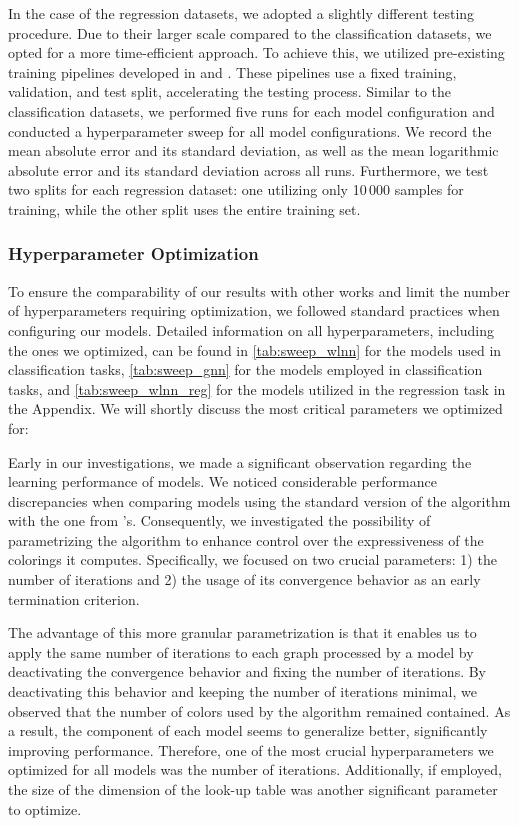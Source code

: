 In the case of the regression datasets, we adopted a slightly different testing procedure. Due to their larger scale compared to the classification datasets, we opted for a more time-efficient approach. To achieve this, we utilized pre-existing training pipelines developed in \cite{Mor+2020} and \cite{Morris2022}. These pipelines use a fixed training, validation, and test split, accelerating the testing process. Similar to the classification datasets, we performed five runs for each model configuration and conducted a hyperparameter sweep for all model configurations. We record the mean absolute error and its standard deviation, as well as the mean logarithmic absolute error and its standard deviation across all runs. Furthermore, we test two splits for each regression dataset: one utilizing only 10\,000 samples for training, while the other split uses the entire training set. 

\subsubsection{Hyperparameter Optimization}\label{sec:hyperparam}
To ensure the comparability of our results with other works and limit the number of hyperparameters requiring optimization, we followed standard practices when configuring our models. Detailed information on all hyperparameters, including the ones we optimized, can be found in \cref{tab:sweep_wlnn} for the \wlnn models used in classification tasks, \cref{tab:sweep_gnn} for the \gnn models employed in classification tasks, and \cref{tab:sweep_wlnn_reg} for the \wlnn models utilized in the regression task in the Appendix. We will shortly discuss the most critical parameters we optimized for:

Early in our investigations, we made a significant observation regarding the learning performance of \wlnn models. We noticed considerable performance discrepancies when comparing \wlnn models using the standard version of the \wl algorithm with the one from \gnn's. Consequently, we investigated the possibility of parametrizing the \wl algorithm to enhance control over the expressiveness of the colorings it computes. Specifically, we focused on two crucial parameters: 1) the number of iterations and 2) the usage of its convergence behavior as an early termination criterion.

The advantage of this more granular parametrization is that it enables us to apply the same number of \wl iterations to each graph processed by a \wlnn model by deactivating the convergence behavior and fixing the number of iterations. By deactivating this behavior and keeping the number of iterations minimal, we observed that the number of colors used by the \wl algorithm remained contained. As a result, the \mlp component of each \wlnn model seems to generalize better, significantly improving performance. Therefore, one of the most crucial hyperparameters we optimized for all \wlnn models was the number of \wl iterations. Additionally, if employed, the size of the dimension of the look-up table was another significant parameter to optimize.

